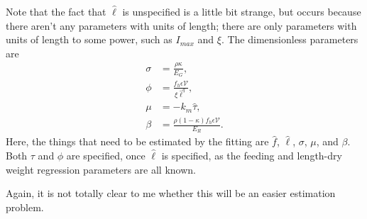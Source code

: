 \documentclass[12pt,reqno,final,pdftex]{amsart}\usepackage[]{graphicx}\usepackage[]{color}
\theoremstyle{plain}
\numberwithin{equation}{part}
\begin{document}
Note that the fact that $\hat{\ell}$ is unspecified is a little bit strange, but occurs because there aren't any parameters with units of length; there are only parameters with units of length to some power, such as $I_{max}$ and $\xi$.
The dimensionless parameters are
\begin{align}
\sigma &= \frac{\rho \kappa}{E_G}, \\
\phi &= \frac{f_h \epsilon \mathcal{V}}{\xi \hat{\ell}^q}, \\
\mu &= -k_m \hat{\tau}, \\
\beta &= \frac{\rho (1-\kappa) f_h \epsilon \mathcal{V}}{E_R}.
\end{align}
Here, the things that need to be estimated by the fitting are $\hat{f}$, $\hat{\ell}$, $\sigma$, $\mu$, and $\beta$.
Both $\tau$ and $\phi$ are specified, once $\hat{\ell}$ is specified, as the feeding and length-dry weight regression parameters are all known.

Again, it is not totally clear to me whether this will be an easier estimation problem.
\end{document}
